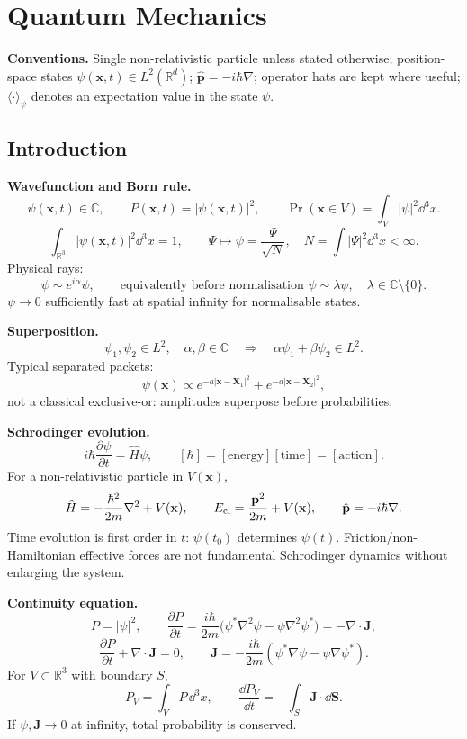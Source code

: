 \section{Quantum Mechanics}
\label{sec:quantum-mechanics}

\noindent\textbf{Conventions.}\quad
Single non-relativistic particle unless stated otherwise; position-space states
\(\psi(\mathbf{x},t)\in L^2(\mathbb{R}^d)\); \(\hat{\mathbf{p}}=-i\hbar\nabla\);
operator hats are kept where useful; \(\langle\cdot\rangle_\psi\) denotes an
expectation value in the state \(\psi\).

\subsection{Introduction}

\noindent\textbf{Wavefunction and Born rule.}
\[
\psi(\mathbf{x},t)\in\mathbb{C},\qquad
P(\mathbf{x},t)=|\psi(\mathbf{x},t)|^2,\qquad
\Pr(\mathbf{x}\in V)=\int_V |\psi|^2\dd^3x .
\]
\[
\boxed{\int_{\mathbb{R}^3}|\psi(\mathbf{x},t)|^2\dd^3x=1},\qquad
\Psi\mapsto\psi=\frac{\Psi}{\sqrt{N}},\quad
N=\int |\Psi|^2\dd^3x<\infty .
\]
Physical rays:
\[
\psi\sim e^{i\alpha}\psi,\qquad
\text{equivalently before normalisation } \psi\sim \lambda\psi,\quad
\lambda\in\mathbb{C}\setminus\{0\}.
\]
\(\psi\to0\) sufficiently fast at spatial infinity for normalisable states.

\noindent\textbf{Superposition.}
\[
\psi_1,\psi_2\in L^2,\quad \alpha,\beta\in\mathbb{C}
\quad\Longrightarrow\quad
\alpha\psi_1+\beta\psi_2\in L^2 .
\]
Typical separated packets:
\[
\psi(\mathbf{x})\propto e^{-a|\mathbf{x}-\mathbf{X}_1|^2}
     +e^{-a|\mathbf{x}-\mathbf{X}_2|^2},
\]
not a classical exclusive-or: amplitudes superpose before probabilities.

\noindent\textbf{Schrodinger evolution.}
\[
\boxed{i\hbar\frac{\partial\psi}{\partial t}=\hat H\psi},\qquad
[\hbar]=[\text{energy}][\text{time}]=[\text{action}].
\]
For a non-relativistic particle in \(V(\mathbf{x})\),
\[
\hat H=-\frac{\hbar^2}{2m}\nabla^2+V(\mathbf{x}),\qquad
E_{\rm cl}=\frac{\mathbf{p}^2}{2m}+V(\mathbf{x}),\qquad
\hat{\mathbf{p}}=-i\hbar\nabla .
\]
Time evolution is first order in \(t\): \(\psi(t_0)\) determines \(\psi(t)\).
Friction/non-Hamiltonian effective forces are not fundamental Schrodinger
dynamics without enlarging the system.

\noindent\textbf{Continuity equation.}
\[
P=|\psi|^2,\qquad
\frac{\partial P}{\partial t}
=\frac{i\hbar}{2m}\big(\psi^*\nabla^2\psi-\psi\nabla^2\psi^*\big)
=-\nabla\cdot\mathbf{J},
\]
\[
\boxed{\frac{\partial P}{\partial t}+\nabla\cdot\mathbf{J}=0},\qquad
\boxed{\mathbf{J}=-\frac{i\hbar}{2m}(\psi^*\nabla\psi-\psi\nabla\psi^*)}.
\]
For \(V\subset\mathbb{R}^3\) with boundary \(S\),
\[
P_V=\int_V P\,\dd^3x,\qquad
\frac{\dd P_V}{\dd t}=-\int_S \mathbf{J}\cdot\dd\mathbf{S}.
\]
If \(\psi,\mathbf{J}\to0\) at infinity, total probability is conserved.

